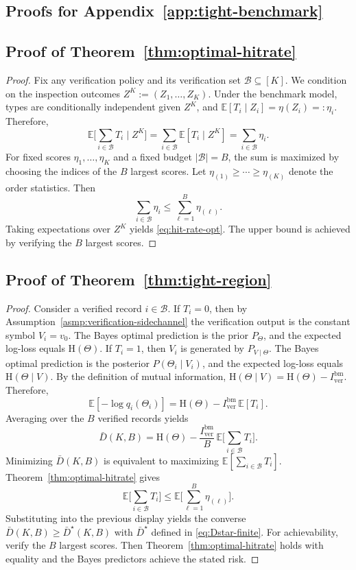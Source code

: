 \documentclass[twocolumn]{scholar7}
\newcommand{\cB}{\mathcal{B}}
\newcommand{\E}{\mathbb{E}}
\newcommand{\Hh}{\mathrm{H}}
\newcommand{\abs}[1]{\left|#1\right|}
\newcommand{\bracks}[1]{\left[#1\right]}
\newcommand{\idx}[1]{\bracks{#1}} %
\begin{document}
\begin{appendix}
\section{Proofs for Appendix~\ref{app:tight-benchmark}}
\label{sec:proofs-tight}

\subsection{Proof of Theorem~\ref{thm:optimal-hitrate}}
\label{app:proof-hitrate}
\begin{proof}
Fix any verification policy and its verification set $\cB\subseteq\idx{K}$.
We condition on the inspection outcomes $Z^K:=(Z_1,\dots,Z_K)$.
Under the benchmark model, types are conditionally independent given $Z^K$, and $\E[T_i\mid Z_i]=\eta(Z_i)=:\eta_i$.
Therefore,
\[
\E\Big[\sum_{i\in\cB} T_i \mid Z^K\Big]
=
\sum_{i\in\cB} \E[T_i\mid Z^K]
=
\sum_{i\in\cB} \eta_i.
\]
For fixed scores $\eta_1,\dots,\eta_K$ and a fixed budget $\abs{\cB}=B$, the sum is maximized by choosing the indices of the $B$ largest scores.
Let $\eta_{(1)}\ge\cdots\ge\eta_{(K)}$ denote the order statistics.
Then
\[
\sum_{i\in\cB} \eta_i \le \sum_{\ell=1}^{B} \eta_{(\ell)}.
\]
Taking expectations over $Z^K$ yields \eqref{eq:hit-rate-opt}.
The upper bound is achieved by verifying the $B$ largest scores.
\end{proof}

\subsection{Proof of Theorem~\ref{thm:tight-region}}
\label{app:proof-region}
\begin{proof}
Consider a verified record $i\in\cB$.
If $T_i=0$, then by Assumption~\ref{asmp:verification-sidechannel} the verification output is the constant symbol $V_i=v_0$.
The Bayes optimal prediction is the prior $P_\Theta$, and the expected log-loss equals $\Hh(\Theta)$.
If $T_i=1$, then $V_i$ is generated by $P_{V\mid\Theta}$.
The Bayes optimal prediction is the posterior $P(\Theta_i\mid V_i)$, and the expected log-loss equals $\Hh(\Theta\mid V)$.
By the definition of mutual information, $\Hh(\Theta\mid V)=\Hh(\Theta)-I_{\mathrm{ver}}^{\mathrm{bm}}$.
Therefore,
\[
\E\bracks{-\log q_i(\Theta_i)}
=
\Hh(\Theta)-I_{\mathrm{ver}}^{\mathrm{bm}}\,\E[T_i].
\]
Averaging over the $B$ verified records yields
\[
\bar{D}(K,B)
=
\Hh(\Theta)-\frac{I_{\mathrm{ver}}^{\mathrm{bm}}}{B}\,\E\Big[\sum_{i\in\cB} T_i\Big].
\]
Minimizing $\bar{D}(K,B)$ is equivalent to maximizing $\E[\sum_{i\in\cB} T_i]$.
Theorem~\ref{thm:optimal-hitrate} gives
\[
\E\Big[\sum_{i\in\cB} T_i\Big]
\le
\E\Big[\sum_{\ell=1}^{B} \eta_{(\ell)}\Big].
\]
Substituting into the previous display yields the converse $\bar{D}(K,B)\ge \bar{D}^\star(K,B)$ with $\bar{D}^\star$ defined in \eqref{eq:Dstar-finite}.
For achievability, verify the $B$ largest scores.
Then Theorem~\ref{thm:optimal-hitrate} holds with equality and the Bayes predictors achieve the stated risk.
\end{proof}


\end{appendix}
\end{document}
